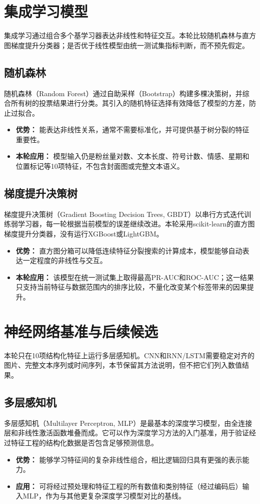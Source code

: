 \section{集成学习模型}
集成学习通过组合多个基学习器表达非线性和特征交互。本轮比较随机森林与直方图梯度提升分类器；是否优于线性模型由统一测试集指标判断，而不预先假定。

\subsection{随机森林}
随机森林（Random Forest）通过自助采样（Bootstrap）构建多棵决策树，并综合所有树的投票结果进行分类。其引入的随机特征选择有效降低了模型的方差，防止过拟合。
\begin{itemize}
	\item \textbf{优势：} 能表达非线性关系，通常不需要标准化，并可提供基于树分裂的特征重要性。
	\item \textbf{本轮应用：} 模型输入仍是粉丝量对数、文本长度、符号计数、情感、星期和位置标记等10项特征，不包含封面图或完整文本语义。
\end{itemize}

\subsection{梯度提升决策树}
梯度提升决策树（Gradient Boosting Decision Trees, GBDT）以串行方式迭代训练弱学习器，每一轮根据当前模型的误差继续改进。本轮采用scikit-learn的直方图梯度提升分类器，没有运行XGBoost或LightGBM。
\begin{itemize}
	\item \textbf{优势：} 直方图分箱可以降低连续特征分裂搜索的计算成本，模型能够自动表达一定程度的非线性与交互。
	\item \textbf{本轮应用：} 该模型在统一测试集上取得最高PR-AUC和ROC-AUC；这一结果只支持当前特征与数据范围内的排序比较，不量化改变某个标签带来的因果提升。
\end{itemize}

\section{神经网络基准与后续候选}
本轮只在10项结构化特征上运行多层感知机。CNN和RNN/LSTM需要稳定对齐的图片、完整文本序列或时间序列，本节保留其方法说明，但不把它们列入数值结果。

\subsection{多层感知机}
多层感知机（Multilayer Perceptron, MLP）是最基本的深度学习模型，由全连接层和非线性激活函数堆叠而成。它可以作为深度学习方法的入门基准，用于验证经过特征工程的结构化数据是否包含足够预测信息。
\begin{itemize}
	\item \textbf{优势：} 能够学习特征间的复杂非线性组合，相比逻辑回归具有更强的表示能力。
	\item \textbf{应用：} 可将经过预处理和特征工程的所有数值和类别特征（经过编码后）输入MLP，作为与其他更复杂深度学习模型对比的基线。
\end{itemize}

